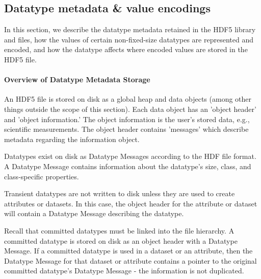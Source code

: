 \subsection{Datatype metadata \& value encodings}


In this section, we describe the datatype metadata retained in the HDF5 library and files, how the values of certain non-fixed-size datatypes are represented and encoded, and how the datatype affects where encoded values are stored in the HDF5 file.

\paragraph{Overview of Datatype Metadata Storage} An HDF5 file is stored on disk as a global heap and data objects (among other things outside the scope of this section). Each data object has an 'object header' and 'object information.' The object information is the user's stored data, e.g., scientific measurements. The object header contains 'messages' which describe metadata regarding the information object.

Datatypes exist on disk as Datatype Messages according to the HDF file format. A Datatype Message contains information about the datatype's size, class, and class-specific properties.

Transient datatypes are not written to disk unless they are used to create attributes or datasets. In this case, the object header for the attribute or dataset will contain a Datatype Message describing the datatype.

Recall that committed datatypes must be linked into the file hierarchy. A committed datatype is stored on disk as an object header with a Datatype Message. If a committed datatype is used in a dataset or an attribute, then the Datatype Message for that dataset or attribute contains a pointer to the original committed datatype's Datatype Message - the information is not duplicated.



